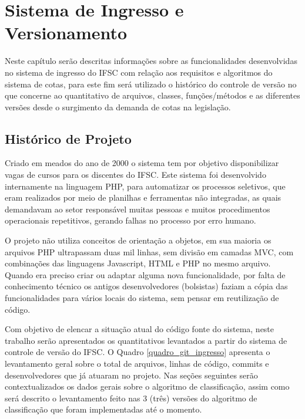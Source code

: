 \chapter{Sistema de Ingresso e Versionamento}
\label{historicoversoes}

Neste capítulo serão descritas informações sobre as funcionalidades desenvolvidas no sistema de ingresso do \gls{IFSC} com relação aos requisitos e algoritmos do sistema de cotas, para este fim será utilizado o histórico do controle de versão no que concerne ao quantitativo de arquivos, classes, funções/métodos e as diferentes versões desde o surgimento da demanda de cotas na legislação.

\section{Histórico de Projeto}
\label{historicopj}
Criado em meados do ano de 2000 o sistema tem por objetivo disponibilizar vagas de cursos para os discentes do \gls{IFSC}. Este sistema foi desenvolvido internamente na linguagem PHP, para automatizar os processos seletivos, que eram realizados por meio de planilhas e ferramentas não integradas, as quais demandavam ao setor responsável muitas pessoas e muitos procedimentos operacionais repetitivos, gerando falhas no processo por erro humano.

O projeto não utiliza conceitos de orientação a objetos, em sua maioria os arquivos PHP ultrapassam duas mil linhas, sem divisão em camadas \gls{MVC}, com combinações das linguagens Javascript, HTML e PHP no mesmo arquivo. Quando era preciso criar ou adaptar alguma nova funcionalidade, por falta de conhecimento técnico os antigos desenvolvedores (bolsistas) faziam a cópia das funcionalidades para vários locais do sistema, sem pensar em reutilização de código.

Com objetivo de elencar a situação atual do código fonte do sistema, neste trabalho serão apresentados os quantitativos levantados a partir do sistema de controle de versão do \gls{IFSC}. O Quadro \ref{quadro_git_ingresso} apresenta o levantamento geral sobre o total de arquivos, linhas de código, commits e desenvolvedores que já atuaram no projeto. Nas seções seguintes serão contextualizados os dados gerais sobre o algoritmo de classificação, assim como será descrito o levantamento feito nas 3 (três) versões do algoritmo de classificação que foram implementadas até o momento.

